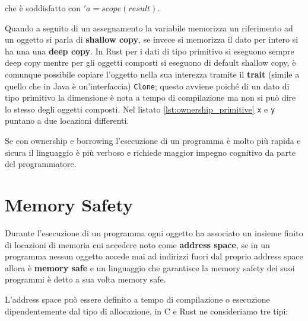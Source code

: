 \documentclass[Lau,binding=0.6cm]{sapthesis}
\newcommand{\textcode}[1]{\colorbox{backcolour}{\texttt{#1}}}
\begin{document}
che è soddisfatto con $ 'a = scope(result) $.




Quando a seguito di un assegnamento la variabile memorizza un riferimento ad un oggetto si parla di \textbf{shallow copy}, se invece si memorizza il dato per intero si ha una una \textbf{deep copy}. 
In Rust per i dati di tipo primitivo si eseguono sempre deep copy mentre per gli oggetti composti si eseguono di default shallow copy, è comunque possibile copiare l'oggetto nella sua interezza tramite il \textbf{trait} (simile a quello che in Java è un'interfaccia) \textcode{Clone}; questo avviene poiché di un dato di tipo primitivo la dimensione è nota a tempo di compilazione ma non si può dire lo stesso degli oggetti composti. Nel listato \ref{lst:ownership_primitive} \textcode{x} e \textcode{y} puntano a due locazioni differenti.



Se con ownership e borrowing l'esecuzione di un programma è molto più rapida e sicura il linguaggio è più verboso e richiede maggior impegno cognitivo da parte del programmatore. 


\chapter{Memory Safety} \label{chap:memory_safety}

Durante l'esecuzione di un programma ogni oggetto ha associato un insieme finito di locazioni di memoria cui accedere noto come \textbf{address space}, se in un programma nessun oggetto accede mai ad indirizzi fuori dal proprio address space allora è \textbf{memory safe} e un linguaggio che garantisce la memory safety dei suoi programmi è detto a sua volta memory safe.

L'address space può essere definito a tempo di compilazione o esecuzione dipendentemente dal tipo di allocazione, in C e Rust ne consideriamo tre tipi:
\end{document}
